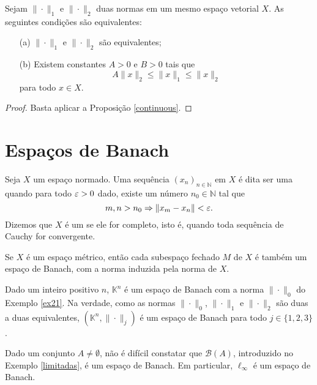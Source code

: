 \begin{corollary}
Sejam $\|\cdot\|_1$ e $\|\cdot\|_2$ duas normas em um mesmo espaço vetorial $X$. As seguintes condições são equivalentes:
\begin{itemize}
\item[(a)] $\|\cdot\|_1$ e $\|\cdot\|_2$ são equivalentes;
\item[(b)] Existem constantes $A>0$ e $B>0$ tais que
\[
A\|x\|_2 \leq \|x\|_1 \leq \|x\|_2
\]
para todo $x\in X$.
\end{itemize}
\end{corollary}

\begin{proof}
Basta aplicar a Proposição \ref{continuous}.
\end{proof}

\section{Espaços de Banach}

\begin{definition}
Seja $X$ um espaço normado. Uma sequência $(x_n)_{n\in \mathbb N}$ em $X$ é dita ser uma   quando para todo $\varepsilon>0$ dado, existe um número $n_0\in \mathbb N$ tal que 
\begin{equation*}
    m,n>n_0 \Rightarrow \|x_m-x_n\|< \varepsilon.
\end{equation*}
Dizemos que $X$ é um   se ele for completo, isto é, quando toda sequência de Cauchy for  convergente.
\end{definition}

\begin{remark}\label{subespaço}
Se $X$ é um espaço métrico, então cada subespaço fechado $M$ de $X$ é também um espaço de Banach, com a norma induzida pela norma de $X$.
\end{remark}

\begin{example}
Dado um inteiro positivo $n$, $\mathbb K ^n$ é um espaço de Banach com a norma $\|\cdot\|_0$ do Exemplo \ref{ex21}. Na verdade, como as normas $\| \cdot\|_0$, $\| \cdot\|_1$ e $\| \cdot\|_2$ são duas a duas equivalentes, $(\mathbb K ^n ,\| \cdot\|_j )$ é um espaço de Banach para todo $j\in \{1,2,3\}$. 
\end{example}

\begin{example}
Dado um conjunto $A\neq \emptyset$, não  é difícil constatar que $\mathcal B (A)$, introduzido no Exemplo \ref{limitadas}, é um espaço de Banach. Em particular, $\ell _{\infty}$ é um espaço de Banach.
\end{example}

